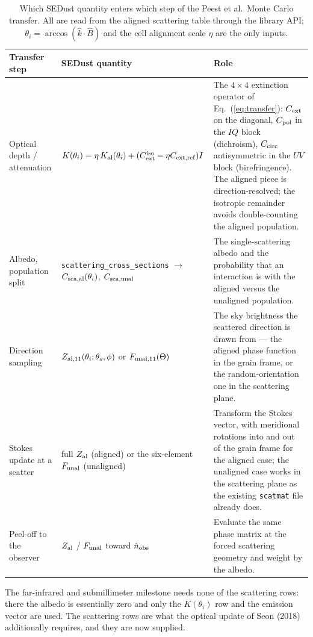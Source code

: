 \documentclass{my_memo}
\newcommand{\code}[1]{\texttt{#1}}
\newcommand{\Cext}{\ensuremath{C_{\rm ext}}}
\newcommand{\Cpol}{\ensuremath{C_{\rm pol}}}
\newcommand{\Ccirc}{\ensuremath{C_{\rm circ}}}
\begin{document}
\begin{table}[!ht]
\centering
\caption{Which SEDust quantity enters which step of the Peest et al.\ Monte Carlo
transfer. All are read from the aligned scattering table through the library API;
$\theta_i = \arccos(\hat k\!\cdot\!\hat B)$ and the cell alignment scale $\eta$
are the only inputs.}
\label{tab:peestmap}
\begin{tabularx}{\textwidth}{l l X}
\toprule
Transfer step & SEDust quantity & Role \\
\midrule
Optical depth / attenuation &
  $K(\theta_i) = \eta\,K_{\rm al}(\theta_i) + (C_{\rm ext}^{\rm iso} -
   \eta C_{\rm ext,ref})I$ &
  The $4\times4$ extinction operator of Eq.~(\ref{eq:transfer}): $\Cext$ on the
  diagonal, $\Cpol$ in the $IQ$ block (dichroism), $\Ccirc$ antisymmetric in the
  $UV$ block (birefringence). The aligned piece is direction-resolved; the
  isotropic remainder avoids double-counting the aligned population. \\
Albedo, population split &
  \code{scattering\_cross\_sections} $\to$ $C_{\rm sca,al}(\theta_i)$,
  $C_{\rm sca,unal}$ &
  The single-scattering albedo and the probability that an interaction is with the
  aligned versus the unaligned population. \\
Direction sampling &
  $Z_{\rm al,11}(\theta_i;\theta_s,\phi)$ or $F_{\rm unal,11}(\Theta)$ &
  The sky brightness the scattered direction is drawn from --- the aligned phase
  function in the grain frame, or the random-orientation one in the scattering
  plane. \\
Stokes update at a scatter &
  full $Z_{\rm al}$ (aligned) or the six-element $F_{\rm unal}$ (unaligned) &
  Transform the Stokes vector, with meridional rotations into and out of the grain
  frame for the aligned case; the unaligned case works in the scattering plane as
  the existing \code{scatmat} file already does. \\
Peel-off to the observer &
  $Z_{\rm al}$ / $F_{\rm unal}$ toward $\hat n_{\rm obs}$ &
  Evaluate the same phase matrix at the forced scattering geometry and weight by
  the albedo. \\
\bottomrule
\end{tabularx}
\end{table}

The far-infrared and submillimeter milestone needs none of the scattering rows:
there the albedo is essentially zero and only the $K(\theta_i)$ row and the
emission vector are used. The scattering rows are what the optical update of
Seon (2018) additionally requires, and they are now supplied.
\end{document}
